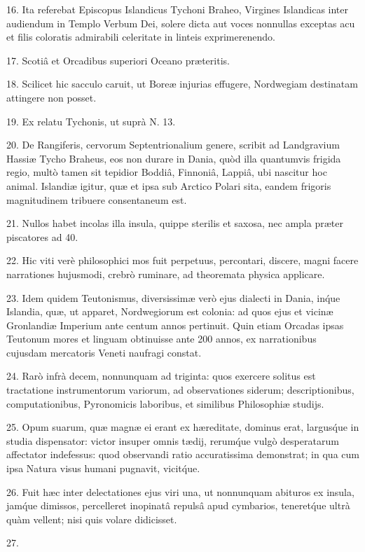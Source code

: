 \documentclass[a4paper, 11pt, oneside, polutonikogreek, german]{article}
\begin{document}
16. Ita referebat Episcopus Islandicus Tychoni Braheo, Virgines Islandicas inter audiendum in Templo Verbum Dei, solere dicta aut voces nonnullas exceptas acu et filis coloratis admirabili celeritate in linteis exprimerenendo.

17. Scotiâ et Orcadibus superiori Oceano præteritis.

18. Scilicet hic sacculo caruit, ut Boreæ injurias effugere, Nordwegiam destinatam attingere non posset.

19. Ex relatu Tychonis, ut suprà N. 13.

20. De Rangiferis, cervorum Septentrionalium genere, scribit ad Landgravium Hassiæ Tycho Braheus, eos non durare in Dania, quòd illa quantumvis frigida regio, multò tamen sit tepidior Boddiâ, Finnoniâ, Lappiâ, ubi nascitur hoc animal. Islandiæ igitur, quæ et ipsa sub Arctico Polari sita, eandem frigoris magnitudinem tribuere consentaneum est.

21. Nullos habet incolas illa insula, quippe sterilis et saxosa, nec ampla præter piscatores ad 40.

22. Hic viti verè philosophici mos fuit perpetuus, percontari, discere, magni facere narrationes hujusmodi, crebrò ruminare, ad theoremata physica applicare.

23. Idem quidem Teutonismus, diversissimæ verò ejus dialecti in Dania, in\'que Islandia, quæ, ut apparet, Nordwegiorum est colonia: ad quos ejus et vicinæ Gronlandiæ Imperium ante centum annos pertinuit. Quin etiam Orcadas ipsas Teutonum mores et linguam obtinuisse ante 200 annos, ex narrationibus cujusdam mercatoris Veneti naufragi constat.

24. Rarò infrà decem, nonnunquam ad triginta: quos exercere solitus est tractatione instrumentorum variorum, ad observationes siderum; descriptionibus, computationibus, Pyronomicis laboribus, et similibus Philosophiæ studijs.

25. Opum suarum, quæ magnæ ei erant ex hæreditate, dominus erat, largus\'que in studia dispensator: victor insuper omnis tædij, rerum\'que vulgò desperatarum affectator indefessus: quod observandi ratio accuratissima demonstrat; in qua cum ipsa Natura visus humani pugnavit, vicit\'que.

26. Fuit hæc inter delectationes ejus viri una, ut nonnunquam abituros ex insula, jam\'que dimissos, percelleret inopinatâ repulsâ apud cymbarios, teneret\'que ultrà quàm vellent; nisi quis volare didicisset.

27.
\end{document}
